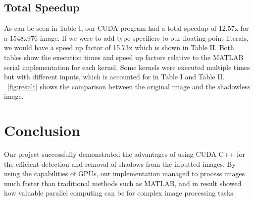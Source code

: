 \documentclass[conference]{IEEEtran}
\begin{document}
      \subsection{Total Speedup}
         As can be seen in Table I, our CUDA program had a total speedup of 12.57x for a 1548x976 image. If we were to add type specifiers to our floating-point literals, we would have a speed up factor of 15.73x which is shown in Table II. Both tables show the execution times and speed up factors relative to the MATLAB serial implementation for each kernel. Some kernels were executed multiple times but with different inputs, which is accounted for in Table I and Table II. \figurename~\ref{fig:result} shows the comparison between the original image and the shadowless image.
   \section{Conclusion}
		 Our project successfully demonstrated the advantages of using CUDA C++ for the efficient detection and removal of shadows from the inputted images. By using the capabilities of GPUs, our implementation managed to process images much faster than traditional methods such as MATLAB, and in result showed how valuable parallel computing can be for complex image processing tasks.
\end{document}
